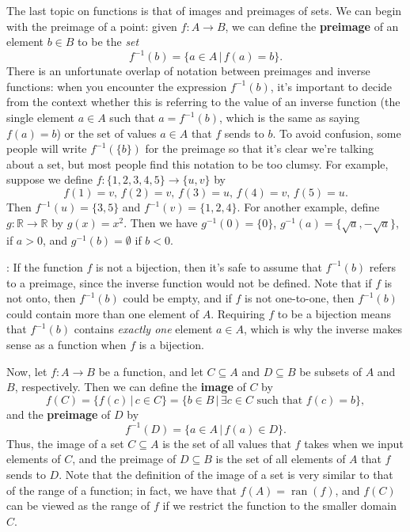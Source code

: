 \documentclass[letterpaper,12pt]{article}
\newcommand{\R}{\mathbb{R}}
\DeclareMathOperator{\ran}{ran}
\begin{document}
The last topic on functions is that of images and preimages of sets. We can begin with the preimage of a point: given $f:A\to B$, we can define the {\bf preimage} of an element $b\in B$ to be the {\em set}
\[
 f^{-1}(b) = \{a\in A \,|\, f(a) = b\}.
\]
There is an unfortunate overlap of notation between preimages and inverse functions: when you encounter the expression $f^{-1}(b)$, it's important to decide from the context whether this is referring to the value of an inverse function (the single element $a\in A$ such that $a=f^{-1}(b)$, which is the same as saying $f(a)=b$) or the set of values $a\in A$ that $f$ sends to $b$. To avoid confusion, some people will write $f^{-1}(\{b\})$ for the preimage so that it's clear we're talking about a set, but most people find this notation to be too clumsy. For example, suppose we define $f:\{1,2,3,4,5\}\to \{u,v\}$ by
\[
 f(1)=v,\, f(2) = v,\, f(3) = u,\, f(4) = v,\, f(5) = u.
\]
Then $f^{-1}(u) = \{3,5\}$ and $f^{-1}(v) = \{1,2,4\}$. For another example, define $g:\R\to\R$ by $g(x)=x^2$. Then we have $g^{-1}(0) = \{0\}$, $g^{-1}(a) = \{\sqrt{a},-\sqrt{a}\}$, if $a>0$, and $g^{-1}(b) = \emptyset$ if $b<0$.

\medskip

: If the function $f$ is not a bijection, then it's safe to assume that $f^{-1}(b)$ refers to a preimage, since the inverse function would not be defined. Note that if $f$ is not onto, then $f^{-1}(b)$ could be empty, and if $f$ is not one-to-one, then $f^{-1}(b)$ could contain more than one element of $A$. Requiring $f$ to be a bijection means that $f^{-1}(b)$ contains {\em exactly one} element $a\in A$, which is why the inverse makes sense as a function when $f$ is a bijection.

\medskip

Now, let $f:A\to B$ be a function, and let $C\subseteq A$ and $D\subseteq B$ be subsets of $A$ and $B$, respectively. Then we can define the {\bf image} of $C$ by
\[
 f(C) = \{f(c) \,|\, c\in C\} = \{b\in B \,|\, \exists c\in C \text{ such that } f(c)=b\},
\]
and the {\bf preimage} of $D$ by
\[
 f^{-1}(D) = \{a\in A \, | \, f(a)\in D\}.
\]
Thus, the image of a set $C\subseteq A$ is the set of all values that $f$ takes when we input elements of $C$, and the preimage of $D\subseteq B$ is the set of all elements of $A$ that $f$ sends to $D$. Note that the definition of the image of a set is very similar to that of the range of a function; in fact, we have that $f(A)=\ran(f)$, and $f(C)$ can be viewed as the range of $f$ if we restrict the function to the smaller domain $C$.
\end{document}
